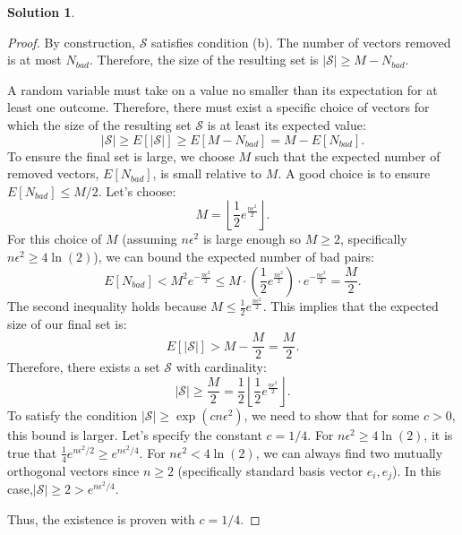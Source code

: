 \documentclass[12pt]{article}
\theoremstyle{definition}
\newtheorem*{solution}{\normalfont\textbf{Solution}}
\begin{document}
\begin{enumerate}[leftmargin=*]
\begin{solution}
\begin{proof}
                By construction, $\mathcal{S}$ satisfies condition (b). The number of vectors removed is at most $N_{bad}$. Therefore, the size of the resulting set is $|\mathcal{S}| \geq M - N_{bad}$.

                A random variable must take on a value no smaller than its expectation for at least one outcome. Therefore, there must exist a specific choice of vectors for which the size of the resulting set $\mathcal{S}$ is at least its expected value:
                \[
                |\mathcal{S}| \geq E[|\mathcal{S}|] \geq E[M - N_{bad}] = M - E[N_{bad}]. 
                \]
                To ensure the final set is large, we choose $M$ such that the expected number of removed vectors, $E[N_{bad}]$, is small relative to $M$. A good choice is to ensure $E[N_{bad}] \leq M/2$. Let's choose:
                $$
                M = \left\lfloor \frac{1}{2} e^{\frac{n\epsilon^2}{2}} \right\rfloor.
                $$
                For this choice of $M$ (assuming $n\epsilon^2$ is large enough so $M \ge 2$, specifically $n\epsilon^2 \geq 4\ln (2)  $), we can bound the expected number of bad pairs:
                $$
                E[N_{bad}] < M^2 e^{-\frac{n\epsilon^2}{2}} \leq M \cdot \left(\frac{1}{2} e^{\frac{n\epsilon^2}{2}}\right) \cdot e^{-\frac{n\epsilon^2}{2}} = \frac{M}{2}.
                $$
                The second inequality holds because $M \le \frac{1}{2} e^{\frac{n\epsilon^2}{2}}$. This implies that the expected size of our final set is:
                $$
                E[|\mathcal{S}|] > M - \frac{M}{2} = \frac{M}{2}.
                $$
                Therefore, there exists a set $\mathcal{S}$ with cardinality:
                $$
                |\mathcal{S}| \geq \frac{M}{2} = \frac{1}{2} \left\lfloor \frac{1}{2} e^{\frac{n\epsilon^2}{2}} \right\rfloor.
                $$
                To satisfy the condition $|\mathcal{S}| \ge \exp(cn\epsilon^2)$, we need to show that for some $c>0$, this bound is larger. Let's specify the constant $c = 1/4$.
                For  $n\epsilon^2 \geq 4\ln(2)$, it is true that $\frac{1}{4}e^{n\epsilon^2/2} \geq e^{n\epsilon^2/4}$. 
                For  $n\epsilon^2 < 4\ln(2)$, we can always find two mutually orthogonal vectors since $n \geq 2$ (specifically standard basis vector \(e_i, e_j\)). 
                In this case,\(|\mathcal{S}| \geq 2 >  e^{n\epsilon^2/4}\).

                Thus, the existence is proven with $c=1/4$.
            \end{proof}


\end{solution}
\end{enumerate}
\end{document}
